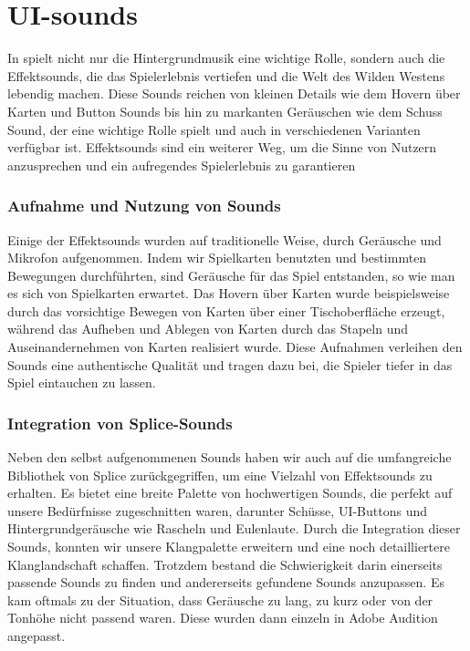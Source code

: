 
\section{UI-sounds}\label{sec:ui-sounds}

\renewcommand{\kapitelautor}{Autor: Nils Hubmann}

%
In \ff spielt nicht nur die Hintergrundmusik eine wichtige Rolle, sondern auch die Effektsounds, die das Spielerlebnis vertiefen und die Welt des Wilden Westens lebendig machen.
Diese Sounds reichen von kleinen Details wie dem Hovern über Karten und Button Sounds bis hin zu markanten Geräuschen wie dem Schuss Sound, der eine wichtige Rolle spielt und auch in verschiedenen Varianten verfügbar ist.
Effektsounds sind ein weiterer Weg, um die Sinne von Nutzern anzusprechen und ein aufregendes Spielerlebnis zu garantieren

\subsubsection{Aufnahme und Nutzung von Sounds}\label{subsubsec:Sound-Aufnahme}
Einige der Effektsounds wurden auf traditionelle Weise, durch Geräusche und Mikrofon aufgenommen.
Indem wir Spielkarten benutzten und bestimmten Bewegungen durchführten, sind Geräusche für das Spiel entstanden, so wie man es sich von Spielkarten erwartet.
Das Hovern über Karten wurde beispielsweise durch das vorsichtige Bewegen von Karten über einer Tischoberfläche erzeugt, während das Aufheben und Ablegen von Karten durch das Stapeln und Auseinandernehmen von Karten realisiert wurde.
Diese Aufnahmen verleihen den Sounds eine authentische Qualität und tragen dazu bei, die Spieler tiefer in das Spiel eintauchen zu lassen.

\subsubsection{Integration von Splice-Sounds}\label{subsubsec:Splice-Sounds}
Neben den selbst aufgenommenen Sounds haben wir auch auf die umfangreiche Bibliothek von Splice zurückgegriffen, um eine Vielzahl von Effektsounds zu erhalten.
Es bietet eine breite Palette von hochwertigen Sounds, die perfekt auf unsere Bedürfnisse zugeschnitten waren, darunter Schüsse, UI-Buttons und Hintergrundgeräusche wie Rascheln und Eulenlaute.
Durch die Integration dieser Sounds, konnten wir unsere Klangpalette erweitern und eine noch detailliertere Klanglandschaft schaffen.
Trotzdem bestand die Schwierigkeit darin einerseits passende Sounds zu finden und andererseits gefundene Sounds anzupassen.
Es kam oftmals zu der Situation, dass Geräusche zu lang, zu kurz oder von der Tonhöhe nicht passend waren.
Diese wurden dann einzeln in Adobe Audition angepasst.

